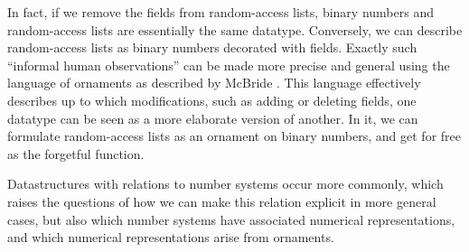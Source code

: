 In fact, if we remove the fields from random-access lists, binary numbers and random-access lists are essentially the same datatype. Conversely, we can describe random-access lists as binary numbers decorated with fields. Exactly such ``informal human observations'' can be made more precise and general using the language of ornaments as described by McBride \cite{algorn}. This language effectively describes up to which modifications, such as adding or deleting fields, one datatype can be seen as a more elaborate version of another. In it, we can formulate random-access lists as an ornament on binary numbers, and get  for free as the forgetful function.

Datastructures with relations to number systems occur more commonly, which raises the questions of how we can make this relation explicit in more general cases, but also which number systems have associated numerical representations, and which numerical representations arise from ornaments.


